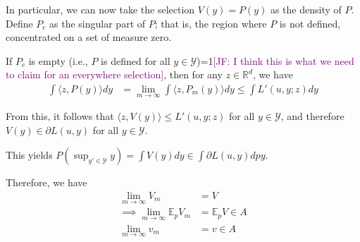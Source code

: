 \documentclass{article}
\newcommand{\Comments}{1}
\newcommand{\mynote}[2]{\ifnum\Comments=1\textcolor{#1}{#2}\fi}
\newcommand{\jessie}[1]{\mynote{purple}{[JF: #1]}}
\newcommand{\reals}{\mathbb{R}}
\newcommand{\E}{\mathbb{E}}
\newcommand{\Y}{\mathcal{Y}}
\newcommand{\inprod}[2]{\langle #1, #2 \rangle}%
\begin{document}
In particular, we can now take the selection $V(y) = P(y)$ as the density of $P$.
Define $P_c$ as the singular part of $P$; that is, the region where $P$ is not defined, concentrated on a set of measure zero.

If $P_c$ is empty (i.e., $P$ is defined for all $y \in \Y$)\jessie{I think this is what we need to claim for an everywhere selection}, then for any $z \in \reals^d$, we have
\begin{align*}
\int \inprod{z}{P(y)} dy &= \lim_{m \to \infty} \int \inprod{z}{P_m(y)} dy \leq \int L'(u,y;z) dy
\end{align*}

From this, it follows that $\inprod{z}{V(y)} \leq L'(u,y;z)$ for all $y \in \Y$, and therefore $V(y) \in \partial L(u,y)$ for all $y \in \Y$.

This yields $P(\sup_{y' \in \Y} y) = \int V(y) dy \in \int \partial L(u,y) dpy$.

Therefore, we have 
\begin{align*}
\lim_{m\to \infty} V_m &= V \\
\implies \lim_{m \to \infty} \E_p V_m &= \E_p V \in A\\
\lim_{m \to \infty} v_m &= v \in A
\end{align*}



\end{document}

